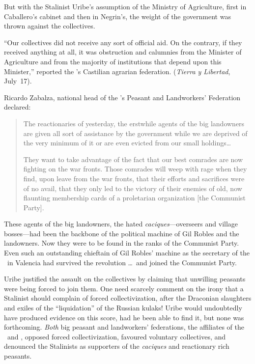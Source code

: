 But with the Stalinist Uribe’s assumption of the Ministry of Agriculture, first in Caballero’s cabinet and then in Negrin’s, the weight of the government was thrown against the collectives.

``Our collectives did not receive any sort of official aid. On the contrary, if they received anything at all, it was obstruction and calumnies from the Minister of Agriculture and from the majority of institutions that depend upon this Minister,'' reported the \CNT’s Castilian agrarian federation. (\emph{Tierra y Libertad}, July~17).

Ricardo Zabalza, national head of the \UGT’s Peasant and Landworkers’ Federation declared:
\begin{quotation}
  The reactionaries of yesterday, the erstwhile agents of the big landowners are given all sort of assistance by the government while we are deprived of the very minimum of it or are even evicted from our small holdings\dots
  
  They want to take advantage of the fact that our best comrades are now fighting on the war fronts. Those comrades will weep with rage when they find, upon leave from the war fronts, that their efforts and sacrifices were of no avail, that they only led to the victory of their enemies of old, now flaunting membership cards of a proletarian organization [the Communist Party].
\end{quotation}

These agents of the big landowners, the hated \emph{caciques}---overseers and village bosses---had been the backbone of the political machine of Gil Robles and the landowners. Now they were to be found in the ranks of the Communist Party. Even such an outstanding chieftain of Gil Robles’ machine as the secretary of the \CEDA\ in Valencia had survived the revolution \dots\ and joined the Communist Party.

Uribe justified the assault on the collectives by claiming that unwilling peasants were being forced to join them. One need scarcely comment on the irony that a Stalinist should complain of forced collectivization, after the Draconian slaughters and exiles of the ``liquidation'' of the Russian kulaks! Uribe would undoubtedly have produced evidence on this score, had he been able to find it, but none was forthcoming. \emph{Both} big peasant and landworkers’ federations, the affiliates of the \CNT\ and \UGT, opposed forced collectivization, favoured voluntary collectives, and denounced the Stalinists as supporters of the \emph{caciques} and reactionary rich peasants.

